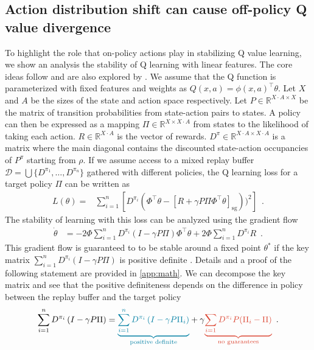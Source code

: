 \subsection{Action distribution shift can cause off-policy Q value divergence}
\label{sec:mad:theory}
To highlight the role that on-policy actions play in stabilizing Q value learning, we show an analysis the stability of Q learning with linear features.
The core ideas follow \textcite{sutton2016emphatic} and are also explored by \textcite{tsitsiklis1996analysis,sutton1988learning}.
We assume that the Q function is parameterized with fixed features and weights as $Q(x,a) = \phi(x,a)^\top \theta$.
Let $X$ and $A$ be the sizes of the state and action space respectively. Let $P \in \mathbb{R}^{X\cdot A \times X}$ be the matrix of transition probabilities from state-action pairs to states.
A policy can then be expressed as a mapping $\Pi \in \mathbb{R}^{X\times X\cdot A}$ from states to the likelihood of taking each action.
$R \in \mathbb{R}^{X\cdot A}$ is the vector of rewards.
$D^{\pi} \in \mathbb{R}^{X\cdot A \times X\cdot A}$ is a matrix where the main diagonal contains the discounted state-action occupancies of $P^\pi$ starting from $\rho$.
If we assume access to a mixed replay buffer $\mathcal{D} = \bigcup \{D^{\pi_1}, \dots, D^{\pi_n}\}$ gathered with different policies, the Q learning loss for a target policy $\Pi$ can be written as
\begin{align}
    L(\theta) = & \sum_{i=1}^n \left[D^{\pi_i}\left(\Phi^\top \theta - [R + \gamma P\Pi \Phi^\top \theta]_\mathrm{sg}\right))^2\right] \enspace.
\end{align}
The stability of learning with this loss can be analyzed using the gradient flow
    \begin{align}
    \dot{\theta} &= - 2 \Phi \sum_{i=1}^n D^{\pi_i} \left(I - \gamma P\Pi \right)\Phi^\top \theta + 2 \Phi \sum_{i=1}^n D^{\pi_i} R \enspace.
\end{align}
This gradient flow is guaranteed to to be stable around a fixed point $\theta^*$ if the key matrix $\sum_{i=1}^n D^{\pi_i} \left(I - \gamma P \Pi \right)$ is positive definite \parencite{sutton1988learning}. 
Details and a proof of the following statement are provided in \autoref{app:math}.
We can decompose the key matrix and see that the positive definiteness depends on the difference in policy between the replay buffer and the target policy
\begin{align}
    \sum_{i=1}^n D^{\pi_i} \left(I - \gamma P\Pi \right) = \blue{\underbrace{\sum_{i=1}^n D^{\pi_i} \left(I - \gamma P\Pi_i \right)}_{\text{positive definite}}} + \gamma \red{\underbrace{\sum_{i=1} D^{\pi_i}P (\Pi_i - \Pi)}_{\text{no guarantees}}} \enspace .
\end{align}
